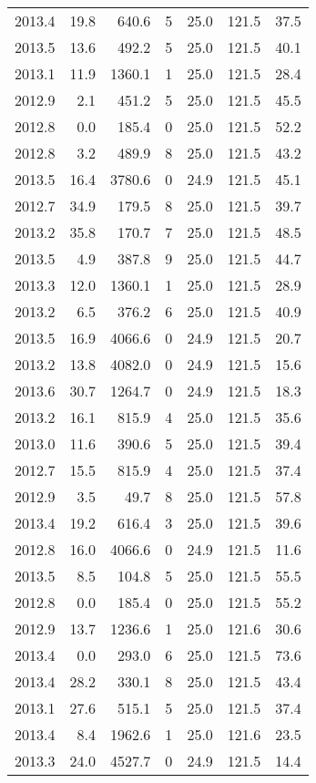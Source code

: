 \begin{tabular}{rrrrrrr}
2013.4 & 19.8 & 640.6 & 5 & 25.0 & 121.5 & 37.5 \\
2013.5 & 13.6 & 492.2 & 5 & 25.0 & 121.5 & 40.1 \\
2013.1 & 11.9 & 1360.1 & 1 & 25.0 & 121.5 & 28.4 \\
2012.9 & 2.1 & 451.2 & 5 & 25.0 & 121.5 & 45.5 \\
2012.8 & 0.0 & 185.4 & 0 & 25.0 & 121.5 & 52.2 \\
2012.8 & 3.2 & 489.9 & 8 & 25.0 & 121.5 & 43.2 \\
2013.5 & 16.4 & 3780.6 & 0 & 24.9 & 121.5 & 45.1 \\
2012.7 & 34.9 & 179.5 & 8 & 25.0 & 121.5 & 39.7 \\
2013.2 & 35.8 & 170.7 & 7 & 25.0 & 121.5 & 48.5 \\
2013.5 & 4.9 & 387.8 & 9 & 25.0 & 121.5 & 44.7 \\
2013.3 & 12.0 & 1360.1 & 1 & 25.0 & 121.5 & 28.9 \\
2013.2 & 6.5 & 376.2 & 6 & 25.0 & 121.5 & 40.9 \\
2013.5 & 16.9 & 4066.6 & 0 & 24.9 & 121.5 & 20.7 \\
2013.2 & 13.8 & 4082.0 & 0 & 24.9 & 121.5 & 15.6 \\
2013.6 & 30.7 & 1264.7 & 0 & 24.9 & 121.5 & 18.3 \\
2013.2 & 16.1 & 815.9 & 4 & 25.0 & 121.5 & 35.6 \\
2013.0 & 11.6 & 390.6 & 5 & 25.0 & 121.5 & 39.4 \\
2012.7 & 15.5 & 815.9 & 4 & 25.0 & 121.5 & 37.4 \\
2012.9 & 3.5 & 49.7 & 8 & 25.0 & 121.5 & 57.8 \\
2013.4 & 19.2 & 616.4 & 3 & 25.0 & 121.5 & 39.6 \\
2012.8 & 16.0 & 4066.6 & 0 & 24.9 & 121.5 & 11.6 \\
2013.5 & 8.5 & 104.8 & 5 & 25.0 & 121.5 & 55.5 \\
2012.8 & 0.0 & 185.4 & 0 & 25.0 & 121.5 & 55.2 \\
2012.9 & 13.7 & 1236.6 & 1 & 25.0 & 121.6 & 30.6 \\
2013.4 & 0.0 & 293.0 & 6 & 25.0 & 121.5 & 73.6 \\
2013.4 & 28.2 & 330.1 & 8 & 25.0 & 121.5 & 43.4 \\
2013.1 & 27.6 & 515.1 & 5 & 25.0 & 121.5 & 37.4 \\
2013.4 & 8.4 & 1962.6 & 1 & 25.0 & 121.6 & 23.5 \\
2013.3 & 24.0 & 4527.7 & 0 & 24.9 & 121.5 & 14.4 \\

\end{tabular}
